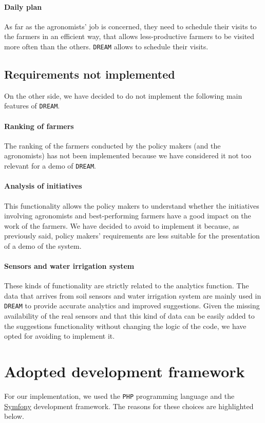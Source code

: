 \documentclass{article}
\begin{document}
\paragraph{Daily plan}
As far as the agronomists' job is concerned, they need to schedule their visits to the farmers in an efficient way, that allows less-productive farmers to be visited more often than the others. \verb|DREAM| allows to schedule their visits.
\subsection{Requirements not implemented}
On the other side, we have decided to do not implement the following main features of \verb|DREAM|.
\paragraph{Ranking of farmers}
The ranking of the farmers conducted by the policy makers (and the agronomists) has not been implemented because we have considered it not too relevant for a demo of \verb|DREAM|.
\paragraph{Analysis of initiatives}
This functionality allows the policy makers to understand whether the initiatives involving
agronomists and best-performing farmers have a good impact on the work of the farmers. We have decided to avoid to implement it because, as previously said, policy makers' requirements are less suitable for the presentation of a demo of the system.
\paragraph{Sensors and water irrigation system}
These kinds of functionality are strictly related to the analytics function. The data that arrives from soil sensors and water irrigation system are mainly used in \verb|DREAM| to provide accurate analytics and improved suggestions. Given the missing availability of the real sensors and that this kind of data can be easily added to the suggestions functionality without changing the logic of the code, we have opted for avoiding to implement it.
\newpage
\section{Adopted development framework}
For our implementation, we used the \verb|PHP| programming language and the \href{https://symfony.com/}{Symfony} development framework. The reasons for these choices are highlighted below.
\end{document}

